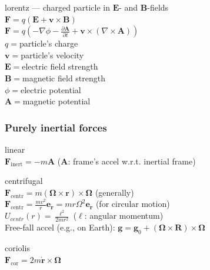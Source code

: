 \documentclass[letterpaper,landscape,10pt]{article}
\newenvironment{mydescription}
{\begin{description}
	\setlength{\itemsep}{0pt}
	\setlength{\parskip}{0pt}
	\setlength{\parsep}{-1pt}}
{\end{description}}
\begin{document}
{\begin{multicols}{4}
\begin{mydescription}
			\item[lorentz]--- charged particle in $\bm{E}$- and $\bm{B}$-fields  \\
				$\bm{F} = q \left( \bm{E} + \bm{v}\times\bm{B} \right)$ \\
				$\bm{F} = q \left( - \nabla \phi - \frac { \partial \bm{A} } { \partial t } + \bm{v} \times \left(\nabla \times \bm{A}\right)\right)$ \\
				\hspace{5pt}$q=$particle's charge \\
				\hspace{5pt}$\bm{v}=$particle's velocity \\
				\hspace{5pt}$\bm{E}=$electric field strength \\
				\hspace{5pt}$\bm{B}=$magnetic field strength \\
				\hspace{5pt}$\phi=$electric potential \\
				\hspace{5pt}$\bm{A}=$magnetic potential

		\end{mydescription}

		\subsubsection*{Purely inertial forces}
			\begin{mydescription}
				\item[linear] \ \\
					$\bm{F_{\mathrm{inert}}}=-m\bm{A}$
					($\bm{A}$: frame's accel w.r.t. inertial frame)

				\item[centrifugal] \ \\
					$\bm{F}_{\mathrm{centr}}=m\left( \bm{\Omega}\times\bm{r}
				  \right)\times\bm{\Omega}$ (generally)\\
				  $\bm{F}_{\mathrm{centr}} = \frac{mv^2}{r}\bm{e_r} =
				   mr\Omega^2\bm{e_r}$ (for circular motion)\\
				  $U_{centr}(r) = \frac{\ell^2}{2mr^2}$ ($\ell$: angular momentum)\\
				  Free-fall accel (e.g., on Earth): $\bm{g}=\bm{g}_0+\left(
				  \bm{\Omega\times\bm{R}} \right)\times\bm{\Omega}$

				\item[coriolis] \ \\
					$\bm{F}_{\mathrm{cor}}=2m\dot{\bm{r}}\times \bm{\Omega}$


\end{mydescription}
\end{multicols}}
\end{document}
